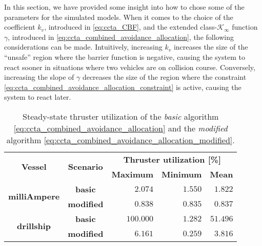 In this section, we have provided some insight into how to chose some of the parameters for the simulated models.
When it comes to the choice of the coefficient $k_v$, introduced in \eqref{eq:ccta_CBF}, and the extended class-$\mathcal{K}_{\infty}$ function $\gamma$, introduced in \eqref{eq:ccta_combined_avoidance_allocation}, the following considerations can be made.
Intuitively, increasing $k_v$ increases the size of the ``unsafe'' region where the barrier function is negative, causing the system to react sooner in situations where two vehicles are on collision course.
Conversely, increasing the slope of $\gamma$ decreases the size of the region where the constraint \eqref{eq:ccta_combined_avoidance_allocation_constraint} is active, causing the system to react later.

\begin{table}[t]
    \centering
    \begin{tabular}{cc|rrr}
        \multirow{2}{*}{\textbf{Vessel}} & \multirow{2}{*}{\textbf{Scenario}} & \multicolumn{3}{|c}{\textbf{Thruster utilization [\%]}} \\
        & & \textbf{Maximum} & \textbf{Minimum} & \textbf{Mean} \\ \hline
        \multirow{2}{*}{\textbf{milliAmpere}} & \textbf{basic} & $2.074$ & $1.550$ & $1.822$ \\
        & \textbf{modified} & $0.838$ & $0.835$ & $0.837$ \\
        \multirow{2}{*}{\textbf{drillship}} & \textbf{basic} & $100.000$ & $1.282$ & $51.496$ \\
        & \textbf{modified} & $6.161$ & $0.259$ & $3.816$ 
    \end{tabular}
    \caption{Steady-state thruster utilization of the \emph{basic} algorithm \eqref{eq:ccta_combined_avoidance_allocation} and the \emph{modified} algorithm \eqref{eq:ccta_combined_avoidance_allocation_modified}.}
    \label{tab:thruster_utilization}
\end{table}
